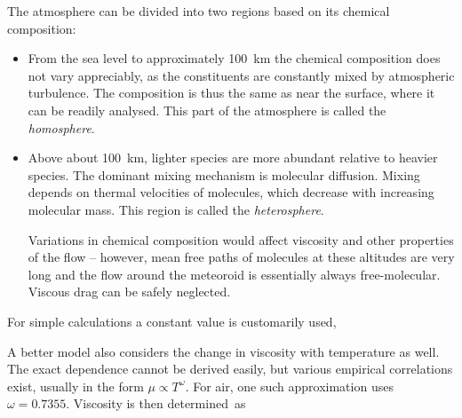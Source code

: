            \begin{example}
                The atmosphere can be divided into two regions based on its chemical composition:
                \begin{itemize}
                    \item From the sea level to approximately \SI{100}{\kilo\metre} the chemical
                        composition does not vary appreciably, as the constituents are constantly mixed by
                        atmospheric turbulence. The composition is thus the same as near the surface,
                        where it can be readily analysed.
                        This part of the atmosphere is called the \emph{homosphere}.
                    \item Above about \SI{100}{\kilo\metre}, lighter species are more abundant
                        relative to heavier species. The dominant mixing mechanism is molecular diffusion.
                        Mixing depends on thermal velocities of molecules, which decrease
                        with increasing molecular mass. This region is called the \emph{heterosphere}.

                        Variations in chemical composition would affect viscosity and other properties
                        of the flow -- however, mean free paths of molecules at these altitudes are
                        very long and the flow around the meteoroid is essentially always free-molecular.
                        Viscous drag can be safely neglected.
                \end{itemize}

            \end{example}

            For simple calculations a constant value is customarily used,

            A better model also considers the change in viscosity with temperature as well.
            The exact dependence cannot be derived easily, but various empirical correlations
            exist, usually in the form $\mu \propto T^\omega$.
            For air, one such approximation \citep{tec-science-viscosity}
            uses $\omega = \num{0.7355}$. Viscosity is then determined~as

